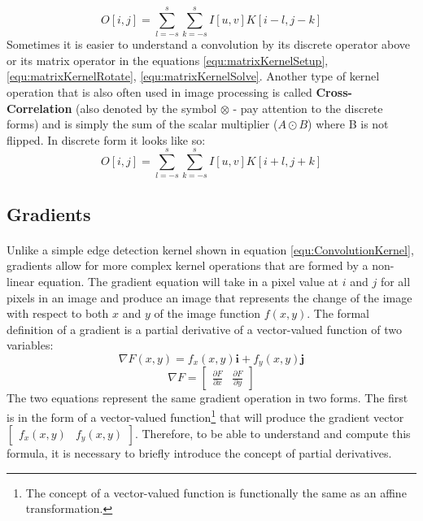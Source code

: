 \documentclass[11pt]{article}
\newcommand\simpleparagraph[1]{%
	\stepcounter{paragraph}\paragraph*{\theparagraph\quad{}#1}}
\renewcommand\theparagraph{}
\begin{document}
\begin{equation}\label{equ:ConvolutionKernel}
	O[i,j]= \sum_{l=-s}^{s}\sum_{k=-s}^{s} I[u,v]K[i-l,j-k]
\end{equation}
Sometimes it is easier to understand a convolution by its discrete operator above or its matrix operator in the equations \ref{equ:matrixKernelSetup}, \ref{equ:matrixKernelRotate}, \ref{equ:matrixKernelSolve}. Another type of kernel operation that is also often used in image processing is called \textbf{Cross-Correlation} (also denoted by the symbol $\otimes$ - pay attention to the discrete forms) and is simply the sum of the scalar multiplier ($A\odot B$) where B is not flipped. In discrete form it looks like so:
\begin{equation}\label{equ:CrossCorrelationKernel}
O[i,j]= \sum_{l=-s}^{s}\sum_{k=-s}^{s} I[u,v]K[i+l,j+k]
\end{equation}

\subsection{Gradients}
\simpleparagraph{}
Unlike a simple edge detection kernel shown in equation \ref{equ:ConvolutionKernel}, gradients allow for more complex kernel operations that are formed by a non-linear equation. The gradient equation will take in a pixel value at $i$ and $j$ for all pixels in an image and produce an image that represents the change of the image with respect to both $x$ and $y$ of the image function $f(x,y)$. The formal definition of a gradient is a partial derivative of a vector-valued function of two variables:
{ \small
	\begin{equation}\label{equ:gradientFunction1}
	\nabla F(x,y)=f_{x}(x,y)\textbf{i}+f_{y}(x,y)\textbf{j}
	\end{equation}
	\begin{equation}\label{equ:gradientFunction2}
	\nabla F=
		\begin{bmatrix}
		\frac{\partial F}{\partial x} & \frac{\partial F}{\partial y}
		\end{bmatrix}
	\end{equation}
}
The two equations represent the same gradient operation in two forms. The first is in the form of a vector-valued function\footnote{The concept of a vector-valued function is functionally the same as an affine transformation.} that will produce the gradient vector $\begin{bmatrix}f_{x}(x,y) & f_{y}(x,y)\end{bmatrix}$. Therefore, to be able to understand and compute this formula, it is necessary to briefly introduce the concept of partial derivatives.
\end{document}
